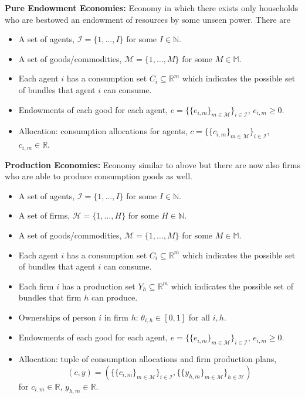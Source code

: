 \documentclass[11pt,english]{article}
\begin{document}
\noindent \textbf{Pure Endowment Economies:} Economy in which there exists only households who are bestowed an endowment of resources by some unseen power. There are
\begin{itemize}
\item A set of agents, $\mathcal{I} = \{1,\ldots, I\}$ for some $I \in \mathbb{N}$.
\item A set of goods/commodities, $\mathcal{M} = \{1,\ldots, M\}$ for some $M\in \mathbb{M}$.
\item Each agent $i$ has a consumption set $C_i\subseteq \mathbb{R}^m$ which indicates the possible set of bundles that agent $i$ can consume.
\item Endowments of each good for each agent, $e = \{\{e_{i,m}\}_{m\in \mathcal{M}}\}_{i\in \mathcal{I}}$, $e_{i,m} \geq 0$.
\item Allocation: consumption allocations for agents, $c = \{\{c_{i,m}\}_{m\in \mathcal{M}}\}_{i\in \mathcal{I}}$, $c_{i,m}\in \mathbb{R}$.
\end{itemize}

\noindent \textbf{Production Economies:} Economy similar to above but there are now also firms who are able to produce consumption goods as well.
\begin{itemize}
\item A set of agents, $\mathcal{I} = \{1,\ldots, I\}$ for some $I \in \mathbb{N}$.
\item A set of firms, $\mathcal{H} = \{1, \ldots, H\}$ for some $H\in \mathbb{N}$.
\item A set of goods/commodities, $\mathcal{M} = \{1,\ldots, M\}$ for some $M\in \mathbb{M}$.
\item Each agent $i$ has a consumption set $C_i\subseteq \mathbb{R}^m$ which indicates the possible set of bundles that agent $i$ can consume.
\item Each firm $i$ has a production set $Y_h\subseteq \mathbb{R}^m$ which indicates the possible set of bundles that firm $h$ can produce.
\item Ownerships of person $i$ in firm $h$: $\theta_{i,h}\in [0,1]$ for all $i,h$.
\item Endowments of each good for each agent, $e = \{\{e_{i,m}\}_{m\in \mathcal{M}}\}_{i\in \mathcal{I}}$, $e_{i,m} \geq 0$.
\item Allocation: tuple of consumption allocations and firm production plans, $$(c, y) = \left(\{\{c_{i,m}\}_{m\in \mathcal{M}}\}_{i\in \mathcal{I}}, \{\{y_{h,m}\}_{m\in \mathcal{M}}\}_{h\in \mathcal{H}}\right)$$ for $c_{i,m}\in \mathbb{R}$, $y_{h,m}\in \mathbb{R}$.
\end{itemize}
\end{document}
